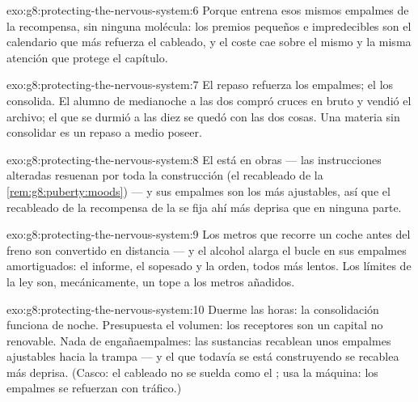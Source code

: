 \begin{solution}{exo:g8:protecting-the-nervous-system:6}
Porque entrena esos mismos empalmes de la recompensa, sin ninguna
molécula: los premios pequeños e impredecibles son el calendario que
más refuerza el cableado, y el coste cae sobre el mismo  y la
misma atención que protege el capítulo.
\end{solution}

\begin{solution}{exo:g8:protecting-the-nervous-system:7}
El repaso refuerza los empalmes; el  los consolida. El alumno de
medianoche a las dos compró cruces en bruto y vendió el archivo; el que
se durmió a las diez se quedó con las dos cosas. Una materia sin
consolidar es un repaso a medio poseer.
\end{solution}

\begin{solution}{exo:g8:protecting-the-nervous-system:8}
El   está en obras --- las instrucciones alteradas
resuenan por toda la construcción (el recableado de la
\cref{rem:g8:puberty:moods}) --- y sus empalmes son los más ajustables,
así que el recableado de la recompensa de la  se fija ahí más
deprisa que en ninguna parte.
\end{solution}

\begin{solution}{exo:g8:protecting-the-nervous-system:9}
Los metros que recorre un coche antes del freno son 
convertido en distancia --- y el alcohol alarga el bucle en sus
empalmes amortiguados: el informe, el sopesado y la orden, todos más
lentos. Los límites de la ley son, mecánicamente, un tope a los metros
añadidos.
\end{solution}

\begin{solution}{exo:g8:protecting-the-nervous-system:10}
Duerme las horas: la consolidación funciona de noche. Presupuesta el
volumen: los receptores son un capital no renovable. Nada de
engañaempalmes: las sustancias recablean unos empalmes ajustables hacia
la trampa --- y el  que todavía se está construyendo se recablea
más deprisa. (Casco: el cableado no se suelda como el ; usa la
máquina: los empalmes se refuerzan con tráfico.)
\end{solution}

